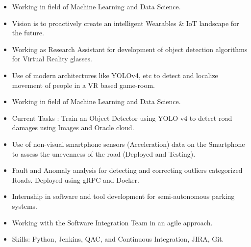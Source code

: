 \documentclass[10pt,a4paper,ragged2e]{altacv}
\begin{document}
\begin{itemize}
\item Working in field of Machine Learning and Data Science.
\item Vision is to proactively create an intelligent Wearables \& IoT landscape for the future.

\divider

\end{itemize}

\begin{itemize}
\item Working as Research Assistant for development of object detection algorithms for Virtual Reality glasses.
\item Use of modern architectures like YOLOv4, etc to detect and localize movement of people in a  VR based game-room.

\divider

\end{itemize}

\begin{itemize}
\item Working in field of Machine Learning and Data Science.
\item Current Tasks : Train an Object Detector using YOLO v4 to detect road damages using Images and Oracle cloud.
\item Use of non-visual smartphone sensors (Acceleration) data on the Smartphone to assess the unevenness of the road (Deployed and Testing).
\item Fault and Anomaly analysis for detecting and correcting outliers categorized Roads. Deployed using gRPC and Docker.

\divider

\end{itemize}




\begin{itemize}
\item Internship in software and tool development for semi-autonomous parking systems.
\item Working with the Software Integration Team in an agile approach.
\item Skills: Python, Jenkins, QAC, and Continuous Integration, JIRA, Git.



\end{itemize}
\end{document}

